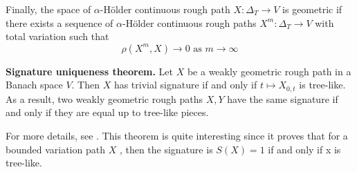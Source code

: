 Finally, the space of $\alpha$-Hölder continuous rough path $X: \Delta _{T} \to  V$ is geometric if there exists a sequence of $\alpha$-Hölder continuous rough paths $X^{m} : \Delta _{T} \to  V $ with total variation such that \begin{equation}
    \rho ( X^{m}, X) \to  0  \text{ as } m \to \infty
\end{equation}



\begin{theorem}
\textbf{Signature uniqueness theorem.}
Let $X$ be a weakly geometric rough path in a Banach space $V$. Then $X$ has trivial signature if and only if $t \mapsto X_{0,t}$ is tree-like. As a result, two weakly geometric rough paths $X, Y$ have the same signature if and only if they are equal up to tree-like pieces.
\end{theorem}

For more details, see \cite{boedihardjo2016signature, hambly2010uniqueness, geng2015signature, geng2017reconstruction}. This theorem is quite interesting since it proves that for a bounded variation path $X$ , then the signature is $S( X) = 1 $ if and only if x is tree-like.



